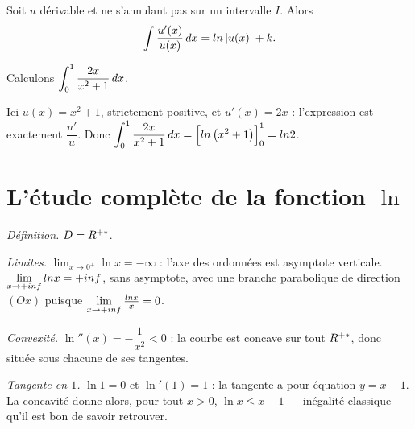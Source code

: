 \begin{theoreme}
Soit $u$ dérivable et ne s'annulant pas sur un intervalle $I$. Alors
\[
  \int \frac{u'(x)}{u(x)}\,dx = ln\left|u(x)\right| + k .
\]
\end{theoreme}

\begin{exemple}
Calculons $\displaystyle\int_{0}^{1} \frac{2x}{x^{2}+1}\,dx$.

Ici $u(x) = x^{2}+1$, strictement positive, et $u'(x) = 2x$ : l'expression est
exactement $\dfrac{u'}{u}$. Donc
$\displaystyle\int_{0}^{1} \frac{2x}{x^{2}+1}\,dx = \Bigl[ln\left(x^{2}+1\right)\Bigr]_{0}^{1}
  = ln 2$.
\end{exemple}

\section{L'étude complète de la fonction $\ln$}

\begin{exemple}
\emph{Définition.} $D = R^{+*}$.

\emph{Limites.} $\lim_{x\to0^{+}} \ln x = -\infty$ : l'axe des ordonnées est
asymptote verticale. $\limpinf \ln x = +\infty$, sans asymptote, avec une
branche parabolique de direction $(Ox)$ puisque $\limpinf \frac{\ln x}{x}=0$.

\emph{Convexité.} $\ln''(x) = -\dfrac{1}{x^{2}} < 0$ : la courbe est concave
sur tout $R^{+*}$, donc située sous chacune de ses tangentes.

\emph{Tangente en $1$.} $\ln 1 = 0$ et $\ln'(1) = 1$ : la tangente a pour
équation $y = x-1$. La concavité donne alors, pour tout $x>0$,
$\ln x \leq x-1$ — inégalité classique qu'il est bon de savoir retrouver.
\end{exemple}

